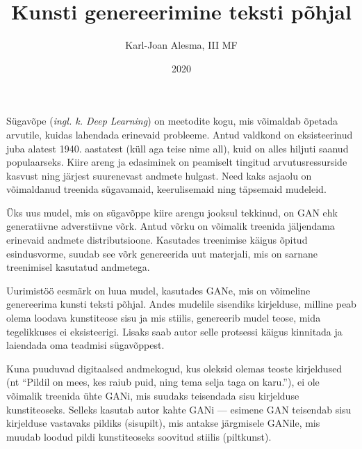 \documentclass{vilgym}
\title{Kunsti genereerimine teksti põhjal}
\author{Karl-Joan Alesma, III MF}
\date{2020}
\begin{document}
	\maketitle
	\tableofcontents



	\newcommand*{\seefig}[1]{(\hyperref[fig:#1]{vt~joonis~\ref{fig:#1}})}
	\newcommand*{\inglk}[1]{(\textit{ingl. k. #1})}

	Sügavõpe \inglk{Deep Learning} on meetodite kogu, mis võimaldab õpetada arvutile, kuidas lahendada erinevaid probleeme. Antud valdkond on eksisteerinud juba alatest 1940. aastatest (küll aga teise nime all), kuid on alles hiljuti saanud populaarseks. Kiire areng ja edasiminek on peamiselt tingitud arvutusressurside kasvust ning järjest suurenevast andmete hulgast. Need kaks asjaolu on võimaldanud treenida sügavamaid, keerulisemaid ning täpsemaid mudeleid. \parencite{deeplearningbook}	 

	Üks uus mudel, mis on sügavõppe kiire arengu jooksul tekkinud, on GAN ehk generatiivne adverstiivne võrk. Antud võrku on võimalik treenida jäljendama erinevaid andmete distributsioone. Kasutades treenimise käigus õpitud esindusvorme, suudab see võrk genereerida uut materjali, mis on sarnane treenimisel kasutatud andmetega. \parencite{gan}

	Uurimistöö eesmärk on luua mudel, kasutades GANe, mis on võimeline genereerima kunsti teksti põhjal. Andes mudelile sisendiks kirjelduse, milline peab olema loodava kunstiteose sisu ja mis stiilis, genereerib mudel teose, mida tegelikkuses ei eksisteerigi. Lisaks saab autor selle protsessi käigus kinnitada ja laiendada oma teadmisi sügavõppest.

	Kuna puuduvad digitaalsed andmekogud, kus oleksid olemas teoste kirjeldused (nt \enquote{Pildil on mees, kes raiub puid, ning tema selja taga on karu.}), ei ole võimalik treenida ühte GANi, mis suudaks teisendada sisu kirjelduse kunstiteoseks. Selleks kasutab autor kahte GANi --- esimene GAN teisendab sisu kirjelduse vastavaks pildiks (sisu\textrightarrow pilt), mis antakse järgmisele GANile, mis muudab loodud pildi kunstiteoseks soovitud stiilis (pilt\textrightarrow kunst).
\end{document}
